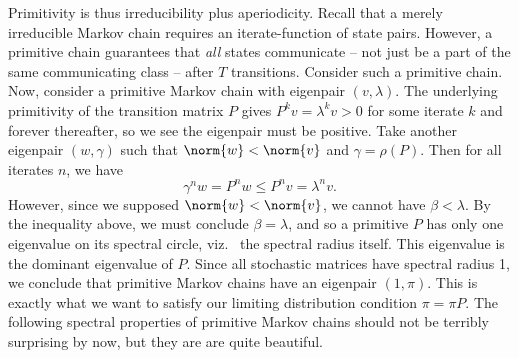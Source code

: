 \documentclass[../exploring-pagerank.tex]{subfiles}
\begin{document}
    Primitivity is thus irreducibility plus aperiodicity. Recall that a merely irreducible Markov chain requires an iterate-function of state pairs. However, a primitive chain guarantees that \textit{all} states communicate -- not just be a part of the same communicating class -- after $T$ transitions. Consider such a primitive chain. Now, consider a primitive Markov chain with eigenpair $(v, \lambda)$. The underlying primitivity of the transition matrix $P$ gives $P^k v = \lambda^k v > 0$ for some iterate $k$ and forever thereafter, so we see the eigenpair must be positive. Take another eigenpair $(w, \gamma)$ such that $\norm{w} < \norm{v}$ and $\gamma = \rho(P)$. Then for all iterates $n$, we have 
    \begin{equation*}
        \gamma^n w = P^n w \leq P^n v = \lambda^n v.
    \end{equation*}
    However, since we supposed $\norm{w} < \norm{v}$, we cannot have $\beta < \lambda$. By the inequality above, we must conclude $\beta = \lambda$, and so a primitive $P$ has only one eigenvalue on its spectral circle, viz.~ the spectral radius itself. This eigenvalue is the dominant eigenvalue of $P$. Since all stochastic matrices have spectral radius 1, we conclude that primitive Markov chains have an eigenpair $(1, \pi)$. This is exactly what we want to satisfy our limiting distribution condition $\pi = \pi P$. The following spectral properties of primitive Markov chains should not be terribly surprising by now, but they are are quite beautiful.
    
\end{document}

